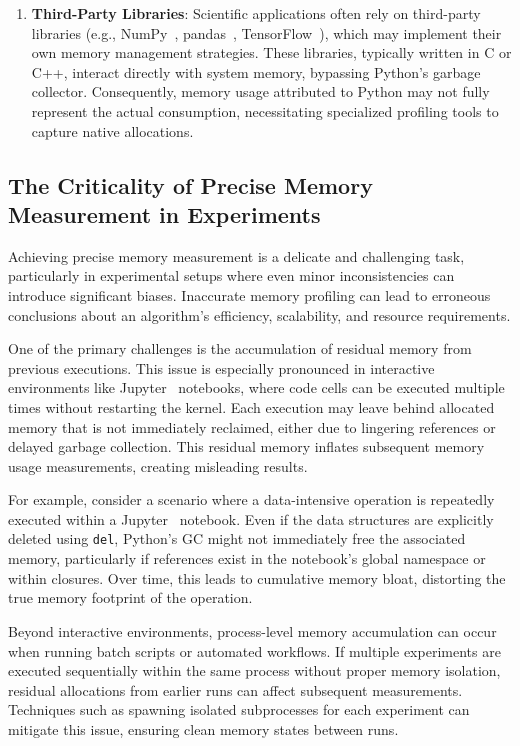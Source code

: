 \begin{enumerate}
    \item \textbf{Third-Party Libraries}:
    Scientific applications often rely on third-party libraries (e.g., NumPy~\cite{numpy}, pandas~\cite{pandas}, TensorFlow~\cite{tensorflow}), which may implement their own memory management strategies.
    These libraries, typically written in C or C++, interact directly with system memory, bypassing Python's garbage collector.
    Consequently, memory usage attributed to Python may not fully represent the actual consumption, necessitating specialized profiling tools to capture native allocations.
\end{enumerate}

\subsection{The Criticality of Precise Memory Measurement in Experiments}

Achieving precise memory measurement is a delicate and challenging task, particularly in experimental setups where even minor inconsistencies can introduce significant biases.
Inaccurate memory profiling can lead to erroneous conclusions about an algorithm's efficiency, scalability, and resource requirements.

One of the primary challenges is the accumulation of residual memory from previous executions.
This issue is especially pronounced in interactive environments like Jupyter~\cite{jupyter} notebooks, where code cells can be executed multiple times without restarting the kernel.
Each execution may leave behind allocated memory that is not immediately reclaimed, either due to lingering references or delayed garbage collection.
This residual memory inflates subsequent memory usage measurements, creating misleading results.

For example, consider a scenario where a data-intensive operation is repeatedly executed within a Jupyter~\cite{jupyter} notebook.
Even if the data structures are explicitly deleted using \texttt{del}, Python's \ac{GC} might not immediately free the associated memory, particularly if references exist in the notebook's global namespace or within closures.
Over time, this leads to cumulative memory bloat, distorting the true memory footprint of the operation.

Beyond interactive environments, process-level memory accumulation can occur when running batch scripts or automated workflows.
If multiple experiments are executed sequentially within the same process without proper memory isolation, residual allocations from earlier runs can affect subsequent measurements.
Techniques such as spawning isolated subprocesses for each experiment can mitigate this issue, ensuring clean memory states between runs.

